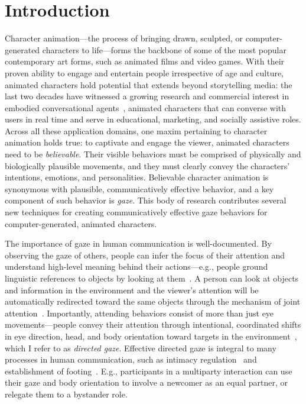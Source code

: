 \pagestyle{deposit}

\chapter{Introduction}

Character animation---the process of bringing drawn, sculpted, or computer-generated characters to life---forms the backbone of some of the most popular contemporary art forms, such as animated films and video games. With their proven ability to engage and entertain people irrespective of age and culture, animated characters hold potential that extends beyond storytelling media: the last two decades have witnessed a growing research and commercial interest in embodied conversational agents~\cite{cassell2000embodied}, animated characters that can converse with users in real time and serve in educational, marketing, and socially assistive roles. Across all these application domains, one maxim pertaining to character animation holds true: to captivate and engage the viewer, animated characters need to be \emph{believable}. Their visible behaviors must be comprised of physically and biologically plausible movements, and they must clearly convey the characters' intentions, emotions, and personalities. Believable character animation is synonymous with plausible, communicatively effective behavior, and a key component of such behavior is \emph{gaze}. This body of research contributes several new techniques for creating communicatively effective gaze behaviors for computer-generated, animated characters.

The importance of gaze in human communication is well-documented. By observing the gaze of others, people can infer the focus of their attention and understand high-level meaning behind their actions---e.g., people ground linguistic references to objects by looking at them~\cite{hanna2007speakers,preissler2005role}. A person can look at objects and information in the environment and the viewer's attention will be automatically redirected toward the same objects through the mechanism of joint attention~\cite{moore2014joint}.
Importantly, attending behaviors consist of more than just eye movements---people convey their attention through intentional, coordinated shifts in eye direction, head, and body orientation toward targets in the environment~\cite{langton2000eyes}, which I refer to as \emph{directed gaze}.
Effective directed gaze is integral to many processes in human communication, such as intimacy regulation~\cite{argyle1965eyecontact} and establishment of footing~\cite{mutlu2012conversational}. E.g., participants in a multiparty interaction can use their gaze and body orientation to involve a newcomer as an equal partner, or relegate them to a bystander role.

